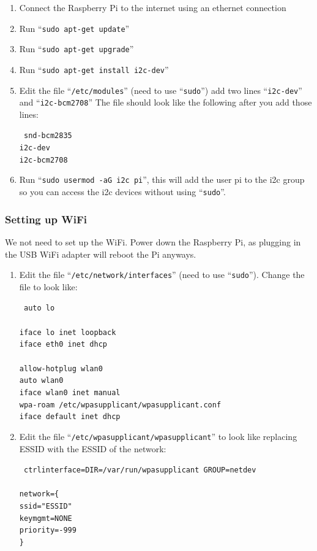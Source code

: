 \documentclass{article}
\begin{document}
\begin{enumerate}
    \item Connect the Raspberry Pi to the internet using an ethernet connection
    \item Run ``{\tt sudo apt-get update}''
    \item Run ``{\tt sudo apt-get upgrade}''
    \item Run ``{\tt sudo apt-get install i2c-dev}''
    \item Edit the file ``{\tt /etc/modules}'' (need to use ``{\tt sudo}'') add two lines ``{\tt i2c-dev}'' and ``{\tt i2c-bcm2708}'' The file should look like the following after you add those lines:

    { \tt
    snd-bcm2835 \\
    i2c-dev \\
    i2c-bcm2708 \\
    }
    \item Run ``{\tt sudo usermod -aG i2c pi}'', this will add the user pi to the i2c group so you can access the i2c devices without using ``{\tt sudo}''.
\end{enumerate}

\subsubsection{Setting up WiFi}
We not need to set up the WiFi. Power down the Raspberry Pi, as plugging in the USB WiFi adapter will reboot the Pi anyways.

\begin{enumerate}
    \item Edit the file ``{\tt /etc/network/interfaces}'' (need to use ``{\tt sudo}''). Change the file to look like:

    {\tt
    auto lo \\
    \hfill \\
    iface lo inet loopback \\
    iface eth0 inet dhcp \\
    \hfill \\
    allow-hotplug wlan0 \\
    auto wlan0 \\
    iface wlan0 inet manual \\
    wpa-roam /etc/wpa\textunderscore supplicant/wpa\textunderscore supplicant.conf \\
    iface default inet dhcp
    }

    \item Edit the file ``{\tt /etc/wpa\textunderscore supplicant/wpa\textunderscore supplicant}'' to look like replacing ESSID with the ESSID of the network:

    {\tt
    ctrl\textunderscore interface=DIR=/var/run/wpa\textunderscore supplicant GROUP=netdev \\
    \hfill \\
    network=\{ \\
    ssid="ESSID" \\
    key\textunderscore mgmt=NONE \\
    priority=-999 \\
    \} \\
    }
\end{enumerate}
\end{document}

